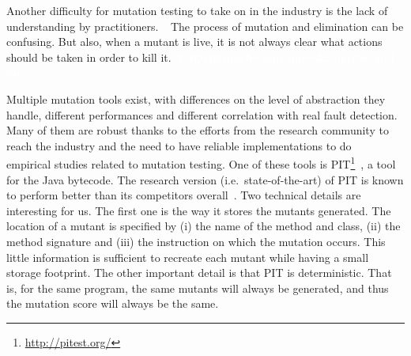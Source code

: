\documentclass[a4paper,11pt]{sdm_internship}
\newcommand{\todo}[1]{\colorbox{Red!75}{\textcolor{white}{\textbf{TODO\ifx&#1&\else: #1\fi}}}}
\newcommand{\rephrase}[1]{\colorbox{BlueViolet!60}{\textcolor{white}{\textbf{$\sim$#1}}}}
\theoremstyle{definition}
\begin{document}
Another difficulty for mutation testing to take on in the industry is the lack of understanding by practitioners.\rephrase{}
The process of mutation and elimination can be confusing.
But also, when a mutant is live, it is not always clear what actions should be taken in order to kill it.
\todo{maybe add more}

Multiple mutation tools exist, with differences on the level of abstraction they handle, different performances and different correlation with real fault detection.
Many of them are robust thanks to the efforts from the research community to reach the industry and the need to have reliable implementations to do\rephrase{} empirical studies related to mutation testing.
One of these tools is PIT\footnote{\url{http://pitest.org/}}~\cite{coles2016pit}, a tool for the Java bytecode.
The research version (i.e.\ state-of-the-art) of PIT is known to perform better than its competitors overall~\cite{kintis2017effective}.
Two technical details are interesting for us.
The first one is the way it stores the mutants generated.
The location of a mutant is specified by (i) the name of the method and class, (ii) the method signature and (iii) the instruction on which the mutation occurs.
This little information is sufficient to recreate each mutant while having a small storage footprint.
The other important detail is that PIT is deterministic.
That is, for the same program, the same mutants will always be generated, and thus the mutation score will always be the same.
\end{document}
